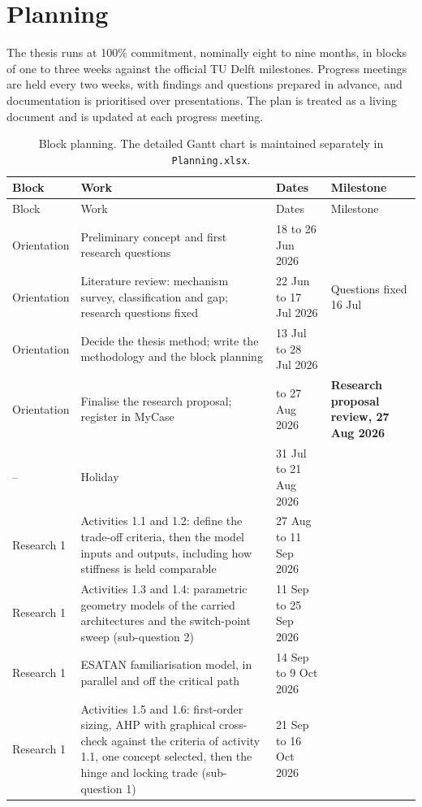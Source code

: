 \chapter{Planning}
\label{chapter:planning}

The thesis runs at 100\% commitment, nominally eight to nine months, in blocks of one to three weeks against the official TU Delft milestones. Progress meetings are held every two weeks, with findings and questions prepared in advance, and documentation is prioritised over presentations. The plan is treated as a living document and is updated at each progress meeting.

{\small
\begin{longtable}{p{1.9cm}p{6.0cm}p{2.5cm}p{3.4cm}}
    \caption{Block planning. The detailed Gantt chart is maintained separately in \texttt{Planning.xlsx}.}
    \label{tab:planning} \\
        \toprule
        Block & Work & Dates & Milestone \\
        \midrule
        \endfirsthead
        \toprule
        Block & Work & Dates & Milestone \\
        \midrule
        \endhead
        Orientation & Preliminary concept and first research questions & 18 to 26 Jun 2026 & \\
        Orientation & Literature review: mechanism survey, classification and gap; research questions fixed & 22 Jun to 17 Jul 2026 & Questions fixed 16 Jul \\
        Orientation & Decide the thesis method; write the methodology and the block planning & 13 Jul to 28 Jul 2026 & \\
        Orientation & Finalise the research proposal; register in MyCase & to 27 Aug 2026 & \textbf{Research proposal review, 27 Aug 2026} \\
        -- & Holiday & 31 Jul to 21 Aug 2026 & \\
        Research 1 & Activities 1.1 and 1.2: define the trade-off criteria, then the model inputs and outputs, including how stiffness is held comparable & 27 Aug to 11 Sep 2026 & \\
        Research 1 & Activities 1.3 and 1.4: parametric geometry models of the carried architectures and the switch-point sweep (sub-question 2) & 11 Sep to 25 Sep 2026 & \\
        Research 1 & ESATAN familiarisation model, in parallel and off the critical path & 14 Sep to 9 Oct 2026 & \\
        Research 1 & Activities 1.5 and 1.6: first-order sizing, AHP with graphical cross-check against the criteria of activity 1.1, one concept selected, then the hinge and locking trade (sub-question 1) & 21 Sep to 16 Oct 2026 & \\

\end{longtable}}
